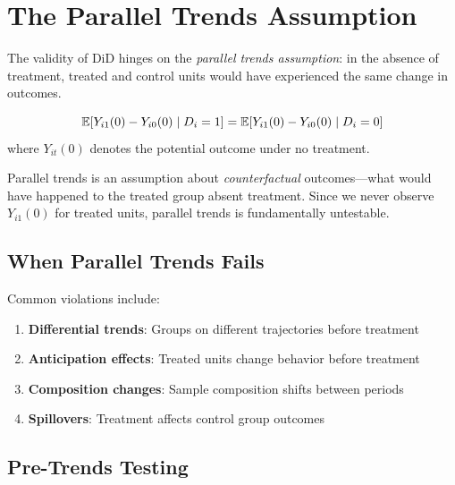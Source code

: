 \section{The Parallel Trends Assumption}
\label{sec:did_parallel}

The validity of DiD hinges on the \emph{parallel trends assumption}: in the absence of treatment, treated and control units would have experienced the same change in outcomes.

\begin{assumption}
\label{assum:parallel_trends}
\begin{equation}
\mathbb{E}[Y_{i1}(0) - Y_{i0}(0) \mid D_i = 1] = \mathbb{E}[Y_{i1}(0) - Y_{i0}(0) \mid D_i = 0]
\end{equation}
where $Y_{it}(0)$ denotes the potential outcome under no treatment.
\end{assumption}

\begin{insight}
Parallel trends is an assumption about \emph{counterfactual} outcomes---what would have happened to the treated group absent treatment. Since we never observe $Y_{i1}(0)$ for treated units, parallel trends is fundamentally untestable.
\end{insight}

\subsection{When Parallel Trends Fails}

Common violations include:

\begin{enumerate}
    \item \textbf{Differential trends}: Groups on different trajectories before treatment
    \item \textbf{Anticipation effects}: Treated units change behavior before treatment
    \item \textbf{Composition changes}: Sample composition shifts between periods
    \item \textbf{Spillovers}: Treatment affects control group outcomes
\end{enumerate}

\subsection{Pre-Trends Testing}

